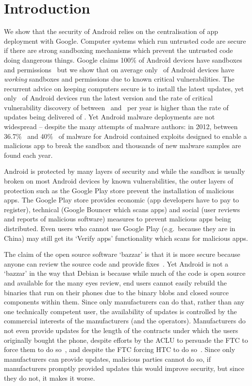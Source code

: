 \documentclass{llncs}
\let\OldTodo\todo
\renewcommand{\todo}{\OldTodo}%
\newcommand{\todolater}[1]{\todo{#1}}%
\begin{document}
\section{Introduction}
We show that the security of Android relies on the centralisation of app deployment with Google.
Computer systems which run untrusted code are secure if there are strong sandboxing mechanisms which prevent the untrusted code doing dangerous things.
Google claims 100\% of Android devices have sandboxes and permissions~\cite{Patterson2013} but we show that on average only \daMeanSecurityPercTwosfNominal\ of Android devices have \emph{working} sandboxes and permissions due to known critical vulnerabilities.
The recurrent advice on keeping computers secure is to install the latest updates, yet only \daUpdatednessPercTwosfNominal\ of Android devices run the latest version and the rate of critical vulnerability discovery of between \avoVulnsPerYearAllAndroidTwosfNominal\ and \avoVulnsPerYearTwosfNominal\ per year is higher than the rate of updates being delivered of \daUpdatesPerYearTwosfNominal.
Yet Android malware deployments are not widespread -- despite the many attempts of malware authors:
in 2012, between 36.7\%~\cite{Zhou2012b} and 40\%~\cite{Zhou2012a} of malware for Android contained exploits designed to enable a malicious app to break the sandbox and thousands of new malware samples are found each year\todolater{citation needed}.

Android is protected by many layers of security and while the sandbox is usually broken on most Android devices by known vulnerabilities, the outer layers of protection such as the Google Play store prevent the installation of malicious apps.
The Google Play store provides economic (app developers have to pay to register), technical (Google Bouncer which scans apps) and social (user reviews and reports of malicious software) measures to prevent malicious apps being distributed.
Even users who cannot use Google Play (e.g.\ because they are in China) may still get its `Verify apps' functionality which scans for malicious apps.

The claim of the open source software `bazzar' is that it is more secure because anyone can review the source code and provide fixes~\cite{Raymond1999}.
Yet Android is not a `bazzar' in the way that Debian is because while much of the code is open source and available for the many eyes review, end users cannot easily rebuild the binaries that run on their phones due to the binary blobs and closed source components within them.
Since only manufacturers can do that, rather than any one technically competent user, the availability of updates is controlled by the commercial interests of the manufacturers (and the operators).
Manufacturers do not even provide updates for the length of the contracts under which the users originally bought the phone, despite efforts by the ACLU to persuade the FTC to force them to do so~\cite{Soghoian2013}, and despite the FTC forcing HTC to do so~\cite{FTCHTC2013}.
Since only manufacturers can provide updates, malicious parties cannot do so, if manufacturers promptly provided updates this would improve security, but since they do not, it makes it worse.
\end{document}
